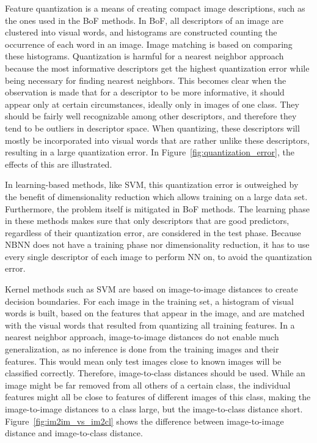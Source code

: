 Feature quantization is a means of creating compact image descriptions, such as the ones used in the BoF methods. In BoF, all descriptors of an image are clustered into visual words, and histograms are constructed counting the occurrence of each word in an image. Image matching is based on comparing these histograms. Quantization is harmful for a nearest neighbor approach because the most informative descriptors get the highest quantization error while being necessary for finding nearest neighbors. This becomes clear when the observation is made that for a descriptor to be more informative, it should appear only at certain circumstances, ideally only in images of one class. They should be fairly well recognizable among other descriptors, and therefore they tend to be outliers in descriptor space. When quantizing, these descriptors will mostly be incorporated into visual words that are rather unlike these descriptors, resulting in a large quantization error. In Figure~\ref{fig:quantization_error}, the effects of this are illustrated.

In learning-based methods, like SVM, this quantization error is outweighed by the benefit of dimensionality reduction which allows training on a large data set. Furthermore, the problem itself is mitigated in BoF methods. The learning phase in these methods makes sure that only descriptors that are good predictors, regardless of their quantization error, are considered in the test phase. Because NBNN does not have a training phase nor dimensionality reduction, it has to use every single descriptor of each image to perform NN on, to avoid the quantization error.

Kernel methods such as SVM are based on image-to-image distances to create decision boundaries. For each image in the training set, a histogram of visual words is built, based on the features that appear in the image, and are matched with the visual words that resulted from quantizing all training features. 
In a nearest neighbor approach, image-to-image distances do not enable much generalization, as no inference is done from the training images and their features. This would mean only test images close to known images will be classified correctly. Therefore, image-to-class distances should be used. While an image might be far removed from all others of a certain class, the individual features might all be close to features of different images of this class, making the image-to-image distances to a class large, but the image-to-class distance short. \cite{wang2009learning} Figure~\ref{fig:im2im_vs_im2cl} shows the difference between image-to-image distance and image-to-class distance.

